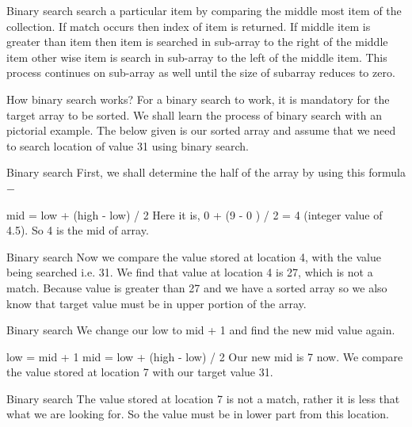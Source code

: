 \documentclass{beamer}
\begin{document}
\begin{frame}
Binary search search a particular item by comparing the middle most item of the collection. If match occurs then index of item is returned. If middle item is greater than item then item is searched in sub-array to the right of the middle item other wise item is search in sub-array to the left of the middle item. This process continues on sub-array as well until the size of subarray reduces to zero.
\end{frame}

\begin{frame}
How binary search works?
For a binary search to work, it is mandatory for the target array to be sorted. We shall learn the process of binary search with an pictorial example. The below given is our sorted array and assume that we need to search location of value 31 using binary search.

Binary search
First, we shall determine the half of the array by using this formula −

mid = low + (high - low) / 2
Here it is, 0 + (9 - 0 ) / 2 = 4 (integer value of 4.5). So 4 is the mid of array.
\end{frame}
\begin{frame}
Binary search
Now we compare the value stored at location 4, with the value being searched i.e. 31. We find that value at location 4 is 27, which is not a match. Because value is greater than 27 and we have a sorted array so we also know that target value must be in upper portion of the array.
\end{frame}
\begin{frame}
Binary search
We change our low to mid + 1 and find the new mid value again.

low = mid + 1
mid = low + (high - low) / 2
Our new mid is 7 now. We compare the value stored at location 7 with our target value 31.

Binary search
The value stored at location 7 is not a match, rather it is less that what we are looking for. So the value must be in lower part from this location.
\end{frame}
\end{document}
